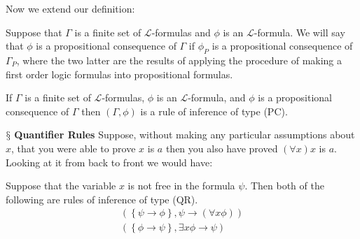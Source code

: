 \documentclass[10pt,a4paper]{article}
\newcommand{\newpoint}[1]{\indent$\mathsection$ \textbf{#1}}
\newcommand{\curveL}{\mathcal{L}}
\begin{document}
                            Now we extend our definition:
                            \begin{define}
                                Suppose that $\Gamma$ is a finite set of $\curveL$-formulas and $\phi$ is an $\curveL$-formula. We will say that $\phi$ is a propositional consequence of $\Gamma$ if $\phi_P$ is a propositional consequence of $\Gamma_P$, where the two latter are the results of applying the procedure of making a first order logic formulas into propositional formulas.
                            \end{define}
                            \begin{define}
                                If $\Gamma$ is a finite set of $\curveL$-formulas, $\phi$ is an $\curveL$-formula, and $\phi$ is a propositional consequence of $\Gamma$ then $(\Gamma,\phi)$ is a rule of inference of type (PC).
                            \end{define}
                            \newpoint{Quantifier Rules} Suppose, without making any particular assumptions about $x$, that you were able to prove $x$ is $a$ then you also have proved $(\forall x)x$ is $a$. Looking at it from back to front we would have:
                            \begin{define}
                                Suppose that the variable $x$ is not free in the formula $\psi$. Then both of the following are rules of inference of type (QR).
                                \begin{align}
                                    \left(\left\{
                                        \psi\rightarrow\phi
                                    \right\}, \psi \rightarrow (\forall x \phi)\right)\\
                                    \left(\left\{
                                        \phi\rightarrow\psi
                                    \right\}, \exists x\phi \rightarrow \psi\right)
                                \end{align}
                            \end{define}
\end{document}

